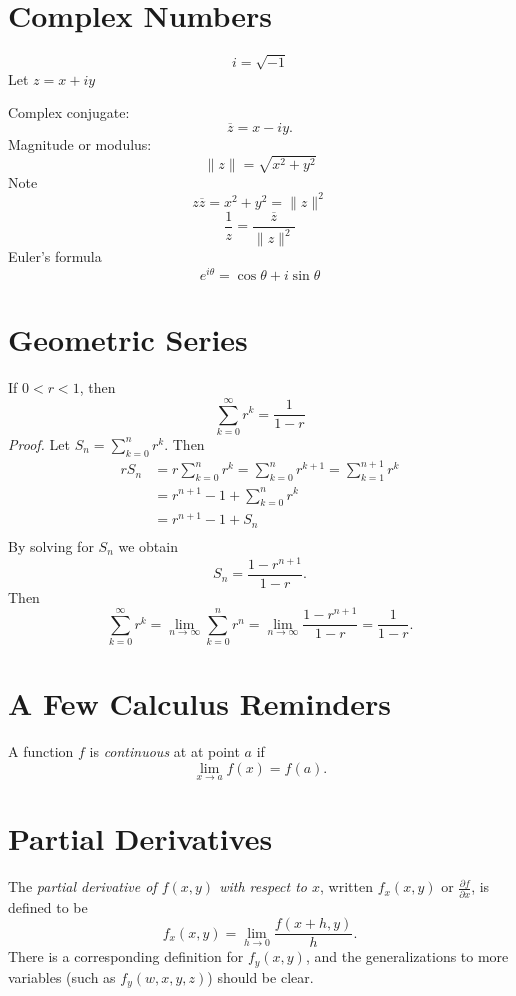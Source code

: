 \documentclass{book}
\begin{document}
\section{Complex Numbers}
%
\[
    i = \sqrt{-1}
\]
Let $z=x+iy$

\medskip
\noindent
Complex conjugate:
\[
   \overline{z} = x-iy.
\]
Magnitude or modulus:
\[
   \| z \| = \sqrt{x^2+y^2}
\]
Note
\[
   z \overline{z} = x^2+y^2 = \| z \|^2
\]
\[
   \frac{1}{z} = \frac{\overline{z}}{\|z\|^2}
\]
Euler's formula
\begin{equation}
   e^{i\theta} = \cos\theta + i \sin\theta
   \label{eqn:EULER}
\end{equation}
%
\section{Geometric Series}
If $0 < r < 1$, then
\begin{equation}
   \sum_{k=0}^{\infty} r^k = \frac{1}{1-r}
\end{equation}
\noindent
\emph{Proof.}
Let $S_n = \sum_{k=0}^{n} r^k$.
Then
\[
\begin{split}
    rS_n & = r\sum_{k=0}^n r^k 
           = \sum_{k=0}^n r^{k+1} 
	   = \sum_{k=1}^{n+1} r^k \\
	 & = r^{n+1} - 1 + \sum_{k=0}^{n} r^k  \\
	 & = r^{n+1} -1 + S_n \\
\end{split}
\]
By solving for $S_n$ we obtain
\[
  S_n = \frac{1-r^{n+1}}{1-r}.
\]
Then
\[
  \sum_{k=0}^{\infty} r^k
    = \lim_{n\rightarrow\infty} \sum_{k=0}^{n} r^n
    = \lim_{n\rightarrow\infty} \frac{1-r^{n+1}}{1-r}
    = \frac{1}{1-r}.
\]
%
\section{A Few Calculus Reminders}

A function $f$ is \emph{continuous} at at point $a$ if
\[
  \lim_{x\rightarrow a} f(x) = f(a).
\]
%
%
\section{Partial Derivatives}
\label{sec:PartialDerivs}
The \emph{partial derivative of $f(x,y)$ with respect to $x$},
written $f_x(x,y)$ or $\frac{\partial f}{\partial x}$, is
defined to be
\[
   f_x(x,y) = \lim_{h\rightarrow 0} \frac{f(x+h,y)}{h}.
\]
There is a corresponding definition for $f_y(x,y)$,
and the generalizations to more variables
(such as $f_y(w,x,y,z)$) should be clear.
%
%
\end{document}
